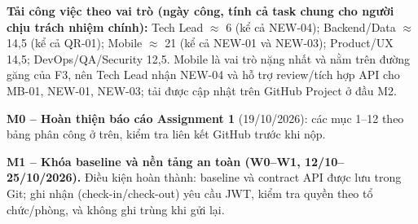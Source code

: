 \textbf{Tải công việc theo vai trò (ngày công, tính cả task chung cho người chịu trách nhiệm chính):} Tech Lead $\approx$ 6 (kể cả NEW-04); Backend/Data $\approx$ 14,5 (kể cả QR-01); Mobile $\approx$ 21 (kể cả NEW-01 và NEW-03); Product/UX 14,5; DevOps/QA/Security 12,5. Mobile là vai trò nặng nhất và nằm trên đường găng của F3, nên Tech Lead nhận NEW-04 và hỗ trợ review/tích hợp API cho MB-01, NEW-01, NEW-03; tải được cập nhật trên GitHub Project ở đầu M2.


\bigskip
\textbf{M0 -- Hoàn thiện báo cáo Assignment 1} (19/10/2026): các mục 1--12 theo bảng phân công ở trên, kiểm tra liên kết GitHub trước khi nộp.

\bigskip
\textbf{M1 -- Khóa baseline và nền tảng an toàn (W0--W1, 12/10--25/10/2026).} Điều kiện hoàn thành: baseline và contract API được lưu trong Git; ghi nhận (check-in/check-out) yêu cầu JWT, kiểm tra quyền theo tổ chức/phòng, và không ghi trùng khi gửi lại.

